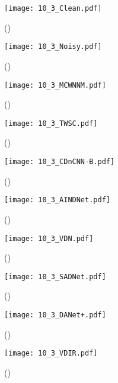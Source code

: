 \documentclass[3p,times]{elsarticle}
\begin{document}
\begin{figure*}[htbp]
	\centering
    \captionsetup[subfigure]{labelformat=empty}
	\begin{subfigure}{0.225\linewidth}
		\centering
		\texttt{[image: 10\_3\_Clean.pdf]}
		\caption{()}
	\end{subfigure}
    \centering
	\begin{subfigure}{0.225\linewidth}
		\centering
		\texttt{[image: 10\_3\_Noisy.pdf]}
		\caption{()}
	\end{subfigure}
    \centering
	\begin{subfigure}{0.225\linewidth}
		\centering
		\texttt{[image: 10\_3\_MCWNNM.pdf]}
		\caption{()}
	\end{subfigure}
    \centering
	\begin{subfigure}{0.225\linewidth}
		\centering
		\texttt{[image: 10\_3\_TWSC.pdf]}
		\caption{()}
	\end{subfigure}
    \centering
	\begin{subfigure}{0.225\linewidth}
		\centering
		\texttt{[image: 10\_3\_CDnCNN-B.pdf]}
		\caption{()}
	\end{subfigure}
    \centering
	\begin{subfigure}{0.225\linewidth}
		\centering
		\texttt{[image: 10\_3\_AINDNet.pdf]}
		\caption{()}
	\end{subfigure}
    \centering
	\begin{subfigure}{0.225\linewidth}
		\centering
		\texttt{[image: 10\_3\_VDN.pdf]}
		\caption{()}
	\end{subfigure}
    \centering
    \centering
	\begin{subfigure}{0.225\linewidth}
		\centering
		\texttt{[image: 10\_3\_SADNet.pdf]}
		\caption{()}
	\end{subfigure}
    \centering
	\begin{subfigure}{0.225\linewidth}
		\centering
		\texttt{[image: 10\_3\_DANet+.pdf]}
		\caption{()}
	\end{subfigure}
    \centering
	\begin{subfigure}{0.225\linewidth}
		\centering
		\texttt{[image: 10\_3\_VDIR.pdf]}
		\caption{()}
	\end{subfigure}
    \centering

\end{figure*}
\end{document}
